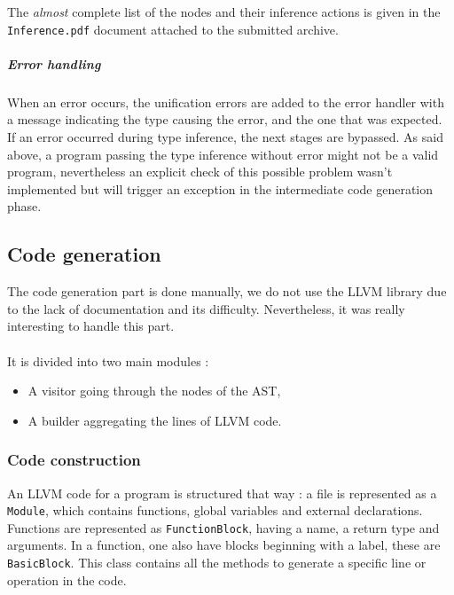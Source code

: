 \documentclass[a4paper,11pt]{article}
\begin{document}
The \textit{almost} complete list of the nodes and their inference actions is given in the \texttt{Inference.pdf} document attached to the submitted archive.
\subparagraph{Error handling} When an error occurs, the unification errors are added to the error handler with a message indicating the type causing the error, and the one that was expected. If an error occurred during type inference, the next stages are bypassed. As said above, a program passing the type inference without error might not be a valid program, nevertheless an explicit check of this possible problem wasn't implemented but will trigger an exception in the intermediate code generation phase.
\subsection{Code generation}

The code generation part is done manually, we do not use the LLVM library due to the lack of documentation and its difficulty. Nevertheless, it was really interesting to handle this part.

\paragraph{}

It is divided into two main modules :
\begin{itemize}
	\item A visitor going through the nodes of the AST,
	\item A builder aggregating the lines of LLVM code.
\end{itemize}

	\subsubsection{Code construction}

An LLVM code for a program is structured that way : a file is represented as a \texttt{Module}, which contains functions, global variables and external declarations. Functions are represented as \texttt{FunctionBlock}, having a name, a return type and arguments. In a function, one also have blocks beginning with a label, these are \texttt{BasicBlock}. This class contains all the methods to generate a specific line or operation in the code.

\paragraph{}
\end{document}
